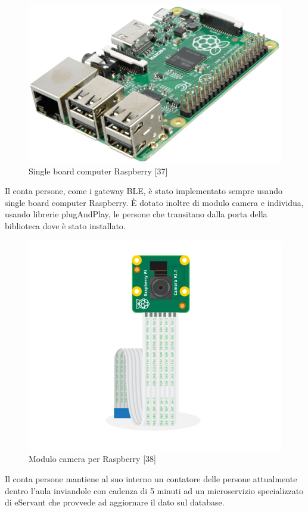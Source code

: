 \begin{figure}[H]
    \centering  
    \caption{Single board computer Raspberry [37]}
    \includegraphics[scale=0.2]{img/cap4/raspberry}
\end{figure}


Il conta persone, come i gateway BLE, è stato implementato sempre usando single board computer
Raspberry.
È dotato inoltre di modulo camera e individua, usando librerie plugAndPlay, le persone che transitano 
dalla porta della biblioteca dove è stato installato.

\begin{figure}[H]
    \centering  
    \caption{Modulo camera per Raspberry [38]}
    \includegraphics[scale=0.2]{img/cap4/camera}
\end{figure}

Il conta persone mantiene al suo interno un contatore delle persone attualmente dentro l'aula
inviandole con cadenza di 5 minuti ad un microservizio specializzato di eServant che provvede ad
aggiornare il dato sul database.

